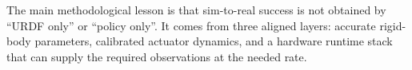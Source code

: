 \documentclass[11pt,a4paper]{article}
\begin{document}
\begin{resultbox}
The main methodological lesson is that sim-to-real success is not obtained by
``URDF only'' or ``policy only''.  It comes from three aligned layers:
accurate rigid-body parameters, calibrated actuator dynamics, and a hardware
runtime stack that can supply the required observations at the needed rate.
\end{resultbox}
\end{document}
